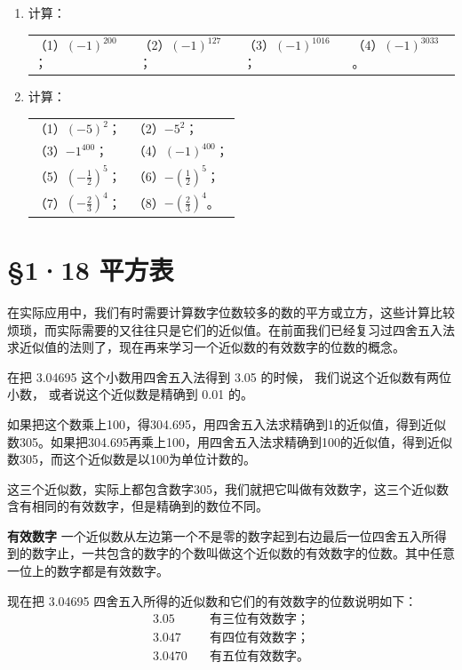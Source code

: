 \begin{enumerate}
\item 计算：
  \par\smallskip
  \begin{tabular}{@{}llll@{}}
  （1）\((-1)^{200}\)；\qquad & （2）\((-1)^{127}\)；\qquad & （3）\((-1)^{1016}\)；\qquad & （4）\((-1)^{3033}\)。
  \end{tabular}

\filbreak
\item 计算：
  \par\smallskip
  \begin{tabular}{@{}ll@{}}
  （1）\((-5)^2\)；\qquad\qquad & （2）\(-5^2\)； \\[6pt]
  （3）\(-1^{400}\)； & （4）\((-1)^{400}\)； \\[6pt]
  （5）\(\left(-\frac{1}{2}\right)^5\)； & （6）\(-\left(\frac{1}{2}\right)^5\)； \\[6pt]
  （7）\(\left(-\frac{2}{3}\right)^4\)； & （8）\(-\left(\frac{2}{3}\right)^4\)。
  \end{tabular}
\end{enumerate}

\section{§1·18 平方表}

在实际应用中，我们有时需要计算数字位数较多的数的平方或立方，这些计算比较烦琐，而实际需要的又往往只是它们的近似值。在前面我们已经复习过四舍五入法求近似值的法则了，现在再来学习一个近似数的有效数字的位数的概念。

在把 3.04695 这个小数用四舍五入法得到 3.05 的时候，
我们说这个近似数有两位小数， 或者说这个近似数是精确到 0.01 的。

如果把这个数乘上100，得304.695，用四舍五入法求精确到1的近似值，得到近似数305。如果把304.695再乘上100，用四舍五入法求精确到100的近似值，得到近似数305，而这个近似数是以100为单位计数的。

这三个近似数，实际上都包含数字305，我们就把它叫做有效数字，这三个近似数含有相同的有效数字，但是精确到的数位不同。

\textbf{有效数字} 一个近似数从左边第一个不是零的数字起到右边最后一位四舍五入所得到的数字止，一共包含的数字的个数叫做这个近似数的有效数字的位数。其中任意一位上的数字都是有效数字。

现在把 3.04695 四舍五入所得的近似数和它们的有效数字的位数说明如下：
\begin{align*}
3.05 &\quad \text{有三位有效数字；} \\
3.047 &\quad \text{有四位有效数字；} \\
3.0470 &\quad \text{有五位有效数字。}
\end{align*}

